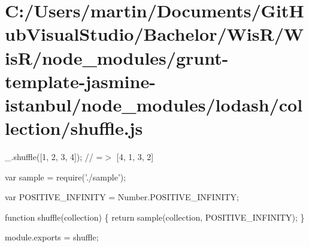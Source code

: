 \hypertarget{_c_1_2_users_2martin_2_documents_2_git_hub_visual_studio_2_bachelor_2_wis_r_2_wis_r_2node_modulef7075f117e1574c8b2c6d3133a9ad85e}{}\section{C\+:/\+Users/martin/\+Documents/\+Git\+Hub\+Visual\+Studio/\+Bachelor/\+Wis\+R/\+Wis\+R/node\+\_\+modules/grunt-\/template-\/jasmine-\/istanbul/node\+\_\+modules/lodash/collection/shuffle.\+js}
\+\_\+.\+shuffle(\mbox{[}1, 2, 3, 4\mbox{]}); // =$>$ \mbox{[}4, 1, 3, 2\mbox{]}


\begin{DoxyCodeInclude}
var sample = require(\textcolor{stringliteral}{'./sample'});

var POSITIVE\_INFINITY = Number.POSITIVE\_INFINITY;

\textcolor{keyword}{function} shuffle(collection) \{
  \textcolor{keywordflow}{return} sample(collection, POSITIVE\_INFINITY);
\}

module.exports = shuffle;
\end{DoxyCodeInclude}
 